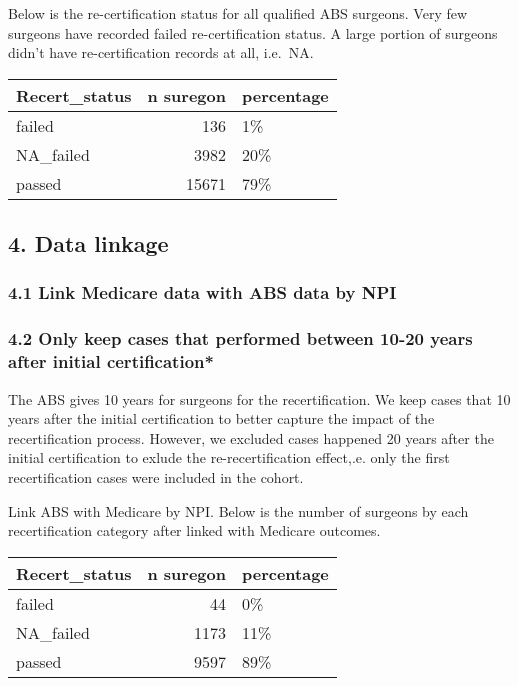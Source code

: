 \documentclass[
]{article}
\begin{document}
Below is the re-certification status for all qualified ABS surgeons.
Very few surgeons have recorded failed re-certification status. A large
portion of surgeons didn't have re-certification records at all,
i.e.~NA.

\begin{table}[H]
\centering
\begin{tabular}{l|r|l}
\hline
Recert\_status & n suregon & percentage\\
\hline
failed & 136 & 1\%\\
\hline
NA\_failed & 3982 & 20\%\\
\hline
passed & 15671 & 79\%\\
\hline
\end{tabular}
\end{table}

\hypertarget{data-linkage}{%
\subsection{4. Data linkage}\label{data-linkage}}

\hypertarget{link-medicare-data-with-abs-data-by-npi}{%
\subsubsection{4.1 Link Medicare data with ABS data by
NPI}\label{link-medicare-data-with-abs-data-by-npi}}

\hypertarget{only-keep-cases-that-performed-between-10-20-years-after-initial-certification}{%
\subsubsection{4.2 Only keep cases that performed between 10-20 years
after initial
certification*}\label{only-keep-cases-that-performed-between-10-20-years-after-initial-certification}}

The ABS gives 10 years for surgeons for the recertification. We keep
cases that 10 years after the initial certification to better capture
the impact of the recertification process. However, we excluded cases
happened 20 years after the initial certification to exlude the
re-recertification effect,.e. only the first recertification cases were
included in the cohort.

Link ABS with Medicare by NPI. Below is the number of surgeons by each
recertification category after linked with Medicare outcomes.

\begin{table}[H]
\centering
\begin{tabular}{l|r|l}
\hline
Recert\_status & n suregon & percentage\\
\hline
failed & 44 & 0\%\\
\hline
NA\_failed & 1173 & 11\%\\
\hline
passed & 9597 & 89\%\\
\hline
\end{tabular}
\end{table}
\end{document}
